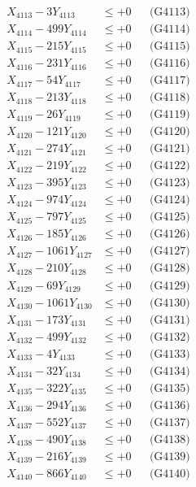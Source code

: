 \documentclass[a4paper,10pt]{article}
\begin{document}
{\begin{align}
X_{4113} - 3Y_{4113} &\leq +0 && \text{(G4113)} \\
X_{4114} - 499Y_{4114} &\leq +0 && \text{(G4114)} \\
X_{4115} - 215Y_{4115} &\leq +0 && \text{(G4115)} \\
X_{4116} - 231Y_{4116} &\leq +0 && \text{(G4116)} \\
X_{4117} - 54Y_{4117} &\leq +0 && \text{(G4117)} \\
X_{4118} - 213Y_{4118} &\leq +0 && \text{(G4118)} \\
X_{4119} - 26Y_{4119} &\leq +0 && \text{(G4119)} \\
X_{4120} - 121Y_{4120} &\leq +0 && \text{(G4120)} \\
\allowbreak
X_{4121} - 274Y_{4121} &\leq +0 && \text{(G4121)} \\
X_{4122} - 219Y_{4122} &\leq +0 && \text{(G4122)} \\
X_{4123} - 395Y_{4123} &\leq +0 && \text{(G4123)} \\
X_{4124} - 974Y_{4124} &\leq +0 && \text{(G4124)} \\
X_{4125} - 797Y_{4125} &\leq +0 && \text{(G4125)} \\
X_{4126} - 185Y_{4126} &\leq +0 && \text{(G4126)} \\
X_{4127} - 1061Y_{4127} &\leq +0 && \text{(G4127)} \\
X_{4128} - 210Y_{4128} &\leq +0 && \text{(G4128)} \\
X_{4129} - 69Y_{4129} &\leq +0 && \text{(G4129)} \\
X_{4130} - 1061Y_{4130} &\leq +0 && \text{(G4130)} \\
\allowbreak
X_{4131} - 173Y_{4131} &\leq +0 && \text{(G4131)} \\
X_{4132} - 499Y_{4132} &\leq +0 && \text{(G4132)} \\
X_{4133} - 4Y_{4133} &\leq +0 && \text{(G4133)} \\
X_{4134} - 32Y_{4134} &\leq +0 && \text{(G4134)} \\
X_{4135} - 322Y_{4135} &\leq +0 && \text{(G4135)} \\
X_{4136} - 294Y_{4136} &\leq +0 && \text{(G4136)} \\
X_{4137} - 552Y_{4137} &\leq +0 && \text{(G4137)} \\
X_{4138} - 490Y_{4138} &\leq +0 && \text{(G4138)} \\
X_{4139} - 216Y_{4139} &\leq +0 && \text{(G4139)} \\
X_{4140} - 866Y_{4140} &\leq +0 && \text{(G4140)} \\

\end{align}}
\end{document}
